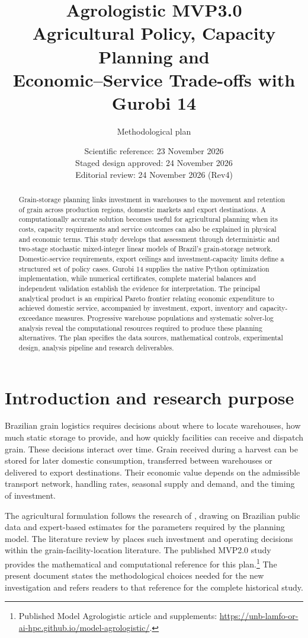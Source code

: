 \documentclass[11pt,a4paper]{article}
\title{\color{navy}Agrologistic MVP3.0\\[5pt]\large Agricultural Policy, Capacity Planning and\\Economic--Service Trade-offs with Gurobi 14}
\author{Methodological plan}
\date{Scientific reference: 23 November 2026\\Staged design approved: 24 November 2026\\Editorial review: 24 November 2026 (Rev4)}
\newcommand{\technical}[2]{\footnote{#1: \url{#2}.}}
\begin{document}
\maketitle

\begin{abstract}
Grain-storage planning links investment in warehouses to the movement and retention of grain across production regions, domestic markets and export destinations. A computationally accurate solution becomes useful for agricultural planning when its costs, capacity requirements and service outcomes can also be explained in physical and economic terms. This study develops that assessment through deterministic and two-stage stochastic mixed-integer linear models of Brazil's grain-storage network. Domestic-service requirements, export ceilings and investment-capacity limits define a structured set of policy cases. Gurobi 14 supplies the native Python optimization implementation, while numerical certificates, complete material balances and independent validation establish the evidence for interpretation. The principal analytical product is an empirical Pareto frontier relating economic expenditure to achieved domestic service, accompanied by investment, export, inventory and capacity-exceedance measures. Progressive warehouse populations and systematic solver-log analysis reveal the computational resources required to produce these planning alternatives. The plan specifies the data sources, mathematical controls, experimental design, analysis pipeline and research deliverables.
\end{abstract}

\begingroup\small\setlength{\parskip}{0pt}\tableofcontents\endgroup
\clearpage
\section{Introduction and research purpose}
\label{sec:intro}

Brazilian grain logistics requires decisions about where to locate warehouses, how much static storage to provide, and how quickly facilities can receive and dispatch grain. These decisions interact over time. Grain received during a harvest can be stored for later domestic consumption, transferred between warehouses or delivered to export destinations. Their economic value depends on the admissible transport network, handling rates, seasonal supply and demand, and the timing of investment.

The agricultural formulation follows the research of \citet{rosa2026thesis}, drawing on Brazilian public data and expert-based estimates for the parameters required by the planning model. The literature review by \citet{rosa2025} places such investment and operating decisions within the grain-facility-location literature. The published MVP2.0 study provides the mathematical and computational reference for this plan.\technical{Published Model Agrologistic article and supplements}{https://unb-lamfo-or-ai-hpc.github.io/model-agrologistic/} The present document states the methodological choices needed for the new investigation and refers readers to that reference for the complete historical study.
\end{document}
